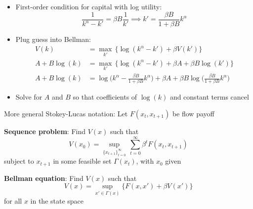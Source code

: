 \documentclass[10pt]{beamer}
\begin{document}
\begin{frame}{}
\begin{itemize}
\item First-order condition for capital with log utility:
\begin{equation*}
	\frac{1}{k^\alpha - k'} = \beta B \frac{1}{k'} \implies  k' = \frac{\beta B}{1 + \beta B} k^\alpha
\end{equation*}

\item Plug guess into Bellman:
\begin{align*}
	V(k) &= \max_{k'} \, \bigg\{ \log(k^\alpha  - k') + \beta V(k') \bigg\} \\
	A + B \log(k) &= \max_{k'} \, \bigg\{ \log(k^\alpha  - k') + \beta A + \beta B \log(k') \bigg\} \\
	A + B \log(k) &= \log\bigg(k^\alpha  - \frac{\beta B}{1 + \beta B} k^\alpha \bigg) + \beta A + \beta B \log\bigg( \frac{\beta B}{1 + \beta B} k^\alpha \bigg)
\end{align*}

\item Solve for $A$ and $B$ so that coefficients of $\log(k)$ and constant terms cancel 

\end{itemize}
\end{frame}



\begin{frame}{}

More general Stokey-Lucas notation: Let $F(x_t, x_{t+1})$ be flow payoff

\vspace{8mm}
\textbf{Sequence problem}: Find $V(x)$ such that 
\begin{equation*}
	V(x_0) = \sup_{ \{ x_{t+1} \}_{t=0}^\infty} \, \sum_{t=0}^\infty \beta^t F(x_t, x_{t+1})
\end{equation*}
subject to $x_{t+1}$ in some feasible set $\Gamma(x_t)$, with $x_0$ given

\vspace{8mm}
\textbf{Bellman equation}: Find $V(x)$ such that 
\begin{equation*}
	V(x) = \sup_{x' \in \Gamma(x)} \Big\{ F(x, x') + \beta V(x') \Big\}
\end{equation*}
for all $x$ in the state space

\end{frame}
\end{document}
